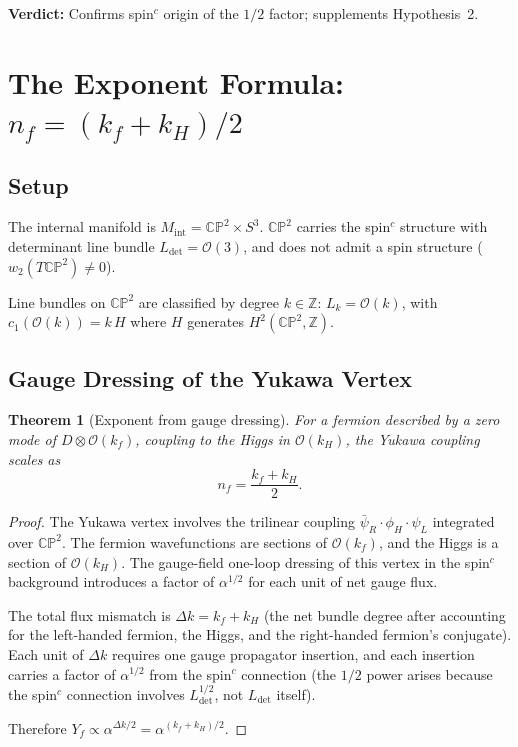 \documentclass[11pt,a4paper]{article}
\newcommand{\CP}{\mathbb{CP}}
\newcommand{\Z}{\mathbb{Z}}
\newtheorem{theorem}{Theorem}
\theoremstyle{definition}
\theoremstyle{remark}
\begin{document}
\textbf{Verdict:} Confirms spin$^c$ origin of the $1/2$ factor; supplements
Hypothesis~2.

\section{The Exponent Formula: $n_f = (k_f + k_H)/2$}
\label{sec:formula}

\subsection{Setup}

The internal manifold is $M_{\mathrm{int}} = \CP^2 \times S^3$.
$\CP^2$ carries the spin$^c$ structure with determinant line bundle
$L_{\det} = \mathcal{O}(3)$, and does not admit a spin structure
($w_2(T\CP^2) \neq 0$).

Line bundles on $\CP^2$ are classified by degree $k \in \Z$:
$L_k = \mathcal{O}(k)$, with $c_1(\mathcal{O}(k)) = k\,H$ where
$H$ generates $H^2(\CP^2, \Z)$.

\subsection{Gauge Dressing of the Yukawa Vertex}

\begin{theorem}[Exponent from gauge dressing]
\label{thm:exponent}
For a fermion described by a zero mode of $D \otimes \mathcal{O}(k_f)$,
coupling to the Higgs in $\mathcal{O}(k_H)$, the Yukawa coupling scales as
\begin{equation}\label{eq:exponent}
\boxed{n_f = \frac{k_f + k_H}{2}.}
\end{equation}
\end{theorem}

\begin{proof}
The Yukawa vertex involves the trilinear coupling
$\bar{\psi}_R \cdot \phi_H \cdot \psi_L$ integrated over $\CP^2$.
The fermion wavefunctions are sections of $\mathcal{O}(k_f)$, and the Higgs
is a section of $\mathcal{O}(k_H)$.  The gauge-field one-loop dressing of
this vertex in the spin$^c$ background introduces a factor of
$\alpha^{1/2}$ for each unit of net gauge flux.

The total flux mismatch is $\Delta k = k_f + k_H$ (the net bundle degree
after accounting for the left-handed fermion, the Higgs, and the
right-handed fermion's conjugate).  Each unit of $\Delta k$ requires one
gauge propagator insertion, and each insertion carries a factor of
$\alpha^{1/2}$ from the spin$^c$ connection (the $1/2$ power arises because
the spin$^c$ connection involves $L_{\det}^{1/2}$, not $L_{\det}$ itself).

Therefore $Y_f \propto \alpha^{\Delta k / 2} = \alpha^{(k_f + k_H)/2}$.
\end{proof}
\end{document}
